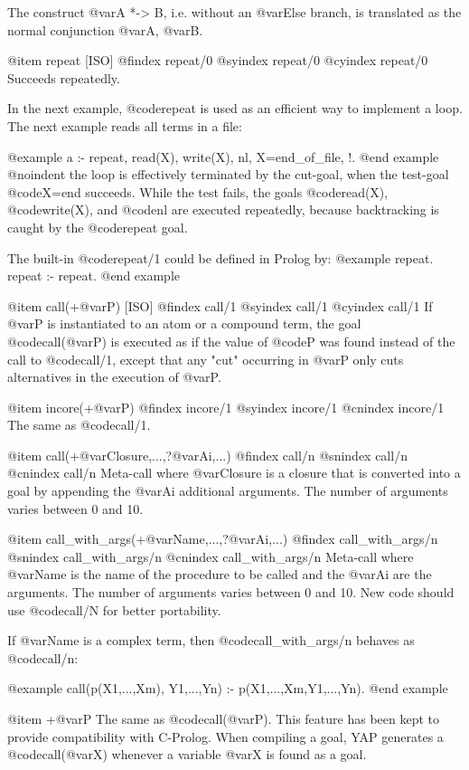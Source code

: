 {{{{    The construct @var{A *-> B}, i.e. without an @var{Else} branch, is
translated as the normal conjunction @var{A}, @var{B}.

@item repeat [ISO]
@findex repeat/0
@syindex repeat/0
@cyindex repeat/0
Succeeds repeatedly.
 
In the next example, @code{repeat} is used as an efficient way to implement
a loop. The next example reads all terms in a file:

@example
 a :- repeat, read(X), write(X), nl, X=end_of_file, !.
@end example
@noindent
the loop is effectively terminated by the cut-goal, when the test-goal
@code{X=end} succeeds. While the test fails, the goals @code{read(X)},
@code{write(X)}, and @code{nl} are executed repeatedly, because
backtracking is caught by the @code{repeat} goal.

The built-in @code{repeat/1} could be defined in Prolog by:
@example
 repeat.
 repeat :- repeat.
@end example

@item call(+@var{P}) [ISO]
@findex call/1
@syindex call/1
@cyindex call/1
 If @var{P} is instantiated to an atom or a compound term, the goal
@code{call(@var{P})} is executed as if the value of @code{P} was found
instead of the call to @code{call/1}, except that any "cut" occurring in
@var{P} only cuts alternatives in the execution of @var{P}.

@item incore(+@var{P})
@findex incore/1
@syindex incore/1
@cnindex incore/1
The same as @code{call/1}.

@item call(+@var{Closure},...,?@var{Ai},...)
@findex call/n
@snindex call/n
@cnindex call/n
Meta-call where @var{Closure} is a closure that is converted into a goal by 
appending the @var{Ai} additional arguments. The number of arguments varies 
between 0 and 10.

@item call_with_args(+@var{Name},...,?@var{Ai},...)
@findex call_with_args/n
@snindex call_with_args/n
@cnindex call_with_args/n
Meta-call where @var{Name} is the name of the procedure to be called and
the @var{Ai} are the arguments. The number of arguments varies between 0
and 10. New code should use @code{call/N} for better portability.

If @var{Name} is a complex term, then @code{call_with_args/n} behaves as
@code{call/n}:

@example
call(p(X1,...,Xm), Y1,...,Yn) :- p(X1,...,Xm,Y1,...,Yn).
@end example


@item +@var{P}
 The same as @code{call(@var{P})}. This feature has been kept to provide
compatibility with C-Prolog. When compiling a goal, YAP
generates a @code{call(@var{X})} whenever a variable @var{X} is found as
a goal.

}}}}
